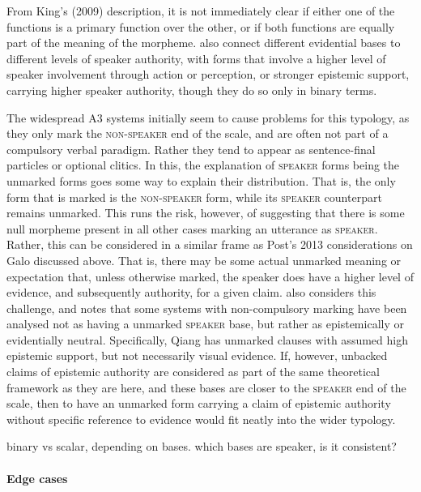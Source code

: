 From King's (2009) description, it is not immediately clear if either one of the functions is a primary function over the other, or if both functions are equally part of the meaning of the morpheme.  also connect different evidential bases to different levels of speaker authority, with forms that involve a higher level of speaker involvement through action or perception, or stronger epistemic support, carrying higher speaker authority, though they do so only in binary terms.

The widespread A3 systems initially seem to cause problems for this typology, as they only mark the \textsc{non-speaker} end of the scale, and are often not part of a compulsory verbal paradigm. Rather they tend to appear as sentence-final particles or optional clitics. In this, the explanation of \textsc{speaker} forms being the unmarked forms goes some way to explain their distribution. That is, the only form that is marked is the \textsc{non-speaker} form, while its \textsc{speaker} counterpart remains unmarked. This runs the risk, however, of suggesting that there is some null morpheme present in all other cases marking an utterance as \textsc{speaker}. Rather, this can be considered in a similar frame as Post's 2013 considerations on Galo discussed above. That is, there may be some actual unmarked meaning or expectation that, unless otherwise marked, the speaker does have a higher level of evidence, and subsequently authority, for a given claim.  also considers this challenge, and notes that some systems with non-compulsory marking have been analysed not as having a unmarked \textsc{speaker} base, but rather as epistemically or evidentially neutral. Specifically, Qiang \cite[Qiangic: PRC][197]{LaPolla2003} has unmarked clauses with assumed high epistemic support, but not necessarily visual evidence. If, however, unbacked claims of epistemic authority are considered as part of the same theoretical framework as they are here, and these bases are closer to the \textsc{speaker} end of the scale, then to have an unmarked form carrying a claim of epistemic authority without specific reference to evidence would fit neatly into the wider typology.

binary vs scalar, depending on bases. which bases are speaker, is it consistent?

\paragraph{Edge cases}

